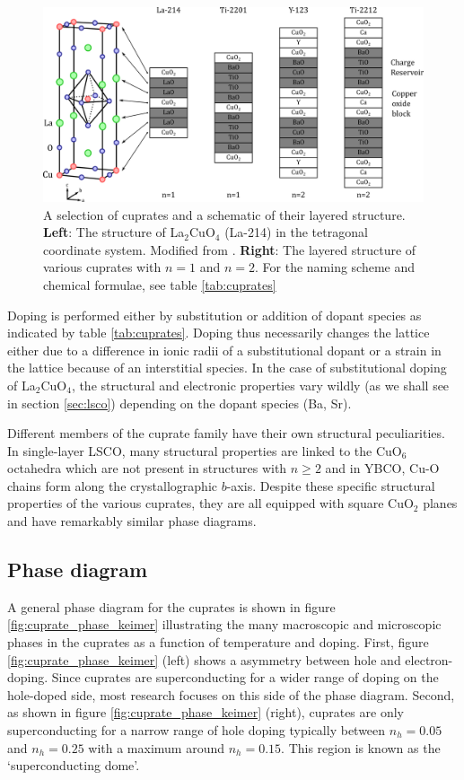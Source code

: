\begin{figure}
    \centering
    \includegraphics[width=\textwidth]{fig/intro/cuprates.png}
    \caption[various cuprate structures]{A selection of cuprates and a schematic of their layered structure. \textbf{Left}: The structure of La$_2$CuO$_4$ (La-214) in the tetragonal coordinate system. Modified from \cite{Hucker2012}. \textbf{Right}: The layered structure of various cuprates with $n=1$ and $n=2$. For the naming scheme and chemical formulae, see table \ref{tab:cuprates}}
    \label{fig:cuprate_family_structures}
\end{figure}

Doping is performed either by substitution or addition of dopant species as indicated by table \ref{tab:cuprates}. Doping thus necessarily changes the lattice either due to a difference in ionic radii of a substitutional dopant or a strain in the lattice because of an interstitial species. In the case of substitutional doping of La$_2$CuO$_4$, the structural and electronic properties vary wildly (as we shall see in section \ref{sec:lsco}) depending on the dopant species (Ba, Sr).

Different members of the cuprate family have their own structural peculiarities. In single-layer LSCO, many structural properties are linked to the CuO$_6$ octahedra which are not present in structures with $n \geq 2$ and in YBCO, Cu-O chains form along the crystallographic $b$-axis. Despite these specific structural properties of the various cuprates, they are all equipped with square CuO$_2$ planes and have remarkably similar phase diagrams.

\subsection{Phase diagram}
A general phase diagram for the cuprates is shown in figure \ref{fig:cuprate_phase_keimer} illustrating the many macroscopic and microscopic phases in the cuprates as a function of temperature and doping. First, figure \ref{fig:cuprate_phase_keimer} (left) shows a asymmetry between hole and electron-doping. Since cuprates are superconducting for a wider range of doping on the hole-doped side, most research focuses on this side of the phase diagram. Second, as shown in figure \ref{fig:cuprate_phase_keimer} (right), cuprates are only superconducting for a narrow range of hole doping typically between $n_h = 0.05$ and $n_h = 0.25$ with a maximum around $n_h = 0.15$. This region is known as the `superconducting dome'. 

